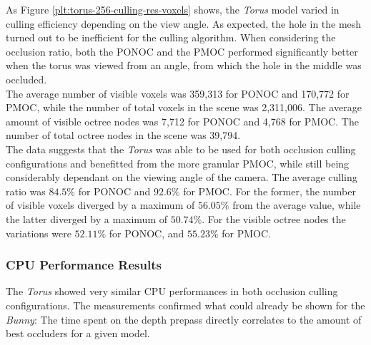 
\noindent
As Figure \ref{plt:torus-256-culling-res-voxels} shows, the \emph{Torus} model varied in culling efficiency 
depending on the view angle. As expected, the hole in the mesh turned out to be inefficient for the culling 
algorithm. When considering the occlusion ratio, both the \ac{PONOC} and the \ac{PMOC} performed significantly 
better when the torus was viewed from an angle, from which the hole in the middle was occluded. \\

\noindent
The average number of visible voxels was 359,313 for \ac{PONOC} and 170,772 for \ac{PMOC}, while the number 
of total voxels in the scene was 2,311,006. The average amount of visible octree nodes was 7,712 for \ac{PONOC} 
and 4,768 for \ac{PMOC}. The number of total octree nodes in the scene was 39,794. \\

\noindent
The data suggests that the \emph{Torus} was able to be used for both occlusion culling configurations and benefitted 
from the more granular \ac{PMOC}, while still being considerably dependant on the viewing angle of the camera. The 
average culling ratio was $84.5\%$ for \ac{PONOC} and $92.6\%$ for \ac{PMOC}. For the former, the number of visible 
voxels diverged by a maximum of $56.05\%$ from the average value, while the latter diverged by a maximum of $50.74\%$. 
For the visible octree nodes the variations were $52.11\%$ for \ac{PONOC}, and $55.23\%$ for \ac{PMOC}.

\subsubsection*{CPU Performance Results} \label{subsubsec-cpu-performance-results-torus}

The \emph{Torus} showed very similar \ac{CPU} performances in both 
occlusion culling configurations. The measurements confirmed what could already be shown for the 
\emph{Bunny}: The time spent on the depth prepass directly correlates to the amount of best occluders 
for a given model.



